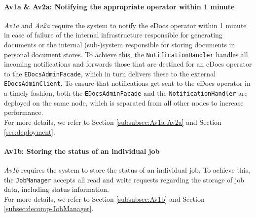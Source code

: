 \documentclass[a4paper,10pt]{article}
\begin{document}
\paragraph{Av1a \& Av2a\@: Notifying the appropriate operator within 1 minute}
\textit{Av1a} and \textit{Av2a} require the system to notify the eDocs operator within 1 minute in case of failure of the internal infrastructure responsible for generating documents or the internal (sub-)system responsible for storing documents in personal document stores. To achieve this, the \texttt{NotificationHandler} handles all incoming notifications and forwards those that are destined for an eDocs operator to the \texttt{EDocsAdminFacade}, which in turn delivers these to the external \texttt{EDocsAdminClient}. To ensure that notifications get sent to the eDocs operator in a timely fashion, both the \texttt{EDocsAdminFacade} and the \texttt{NotificationHandler} are deployed on the same node, which is separated from all other nodes to increase performance.\\
For more details, we refer to Section \ref{subsubsec:Av1a-Av2a} and Section \ref{sec:deployment}.

\paragraph{Av1b\@: Storing the status of an individual job}
\textit{Av1b} requires the system to store the status of an individual job. To achieve this, the \texttt{JobManager} accepts all read and write requests regarding the storage of job data, including status information.\\
For more details, we refer to Section \ref{subsubsec:Av1b} and Section \ref{subsec:decomp-JobManager}.
\end{document}
